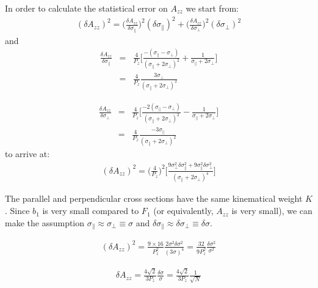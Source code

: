 In order to calculate the statistical error on $A_{zz}$ we start from:
\begin{eqnarray}
(\delta A_{zz})^2 = \Bigg( \frac{\delta A_{zz}}{\delta \sigma_{\parallel}} \Bigg)^2 (\delta \sigma_{\parallel})^2 + \Bigg( \frac{\delta A_{zz}}{\delta \sigma_{\perp}} \Bigg)^2 (\delta \sigma_{\perp})^2
\label{none} 
\end{eqnarray}
and
\begin{eqnarray*}
\frac{\delta A_{zz}}{\delta \sigma_{\parallel}} & = &\frac{4}{P_z} \Bigg[\frac{- (\sigma_{\parallel} - \sigma_{\perp})}{(\sigma_{\parallel} + 2 \sigma_{\perp})^2} + \frac{1}{\sigma_{\parallel} + 2 \sigma_{\perp}} \Bigg] \\
         & = & \frac{4}{P_z} \frac{3 \sigma_{\perp}}{(\sigma_{\parallel} + 2 \sigma_{\perp})^2}
\label{none} 
\end{eqnarray*}


\begin{eqnarray*}
\frac{\delta A_{zz}}{\delta \sigma_{\perp}} & = &\frac{4}{P_z} \Bigg[\frac{- 2 (\sigma_{\parallel} - \sigma_{\perp})}{(\sigma_{\parallel} + 2 \sigma_{\perp})^2} - \frac{1}{\sigma_{\parallel} + 2 \sigma_{\perp}} \Bigg] \\
         & = & \frac{4}{P_z} \frac{-3 \sigma_{\parallel}}{(\sigma_{\parallel} + 2 \sigma_{\perp})^2}
\label{none} 
\end{eqnarray*}
%
to arrive at:
\begin{eqnarray}
(\delta A_{zz})^2 = \Bigg(\frac{4}{P_z}\Bigg)^2 \Bigg[ \frac{9 \sigma_{\perp}^2 \delta \sigma_{\parallel}^2 + 9\sigma_{\parallel}^2 \delta \sigma_{\perp}^2 }{(\sigma_{\parallel} + 2 \sigma_{\perp})^4} \Bigg]
\label{none} 
\end{eqnarray}

The parallel and perpendicular cross sections have the same kinematical weight $K$. Since $b_1$ is very small compared to $F_1$ (or equivalently, $A_{zz}$ is very small), we can make the assumption $\sigma_{\parallel} \approx \sigma_{\perp} \equiv \sigma$ and  $\delta \sigma_{\parallel} \approx  \delta \sigma_{\perp} \equiv \delta \sigma$. 

\begin{eqnarray}
(\delta A_{zz})^2 = \frac{9 \times 16}{P_z^2} \frac{2 \sigma^2 \delta \sigma^2}{(3 \sigma)^4} = \frac{32}{9 P_z^2} \frac{\delta \sigma^2}{\sigma^2}
\label{none} 
\end{eqnarray}

\begin{eqnarray}
\delta A_{zz} = \frac{4 \sqrt{2}}{3 P_z} \frac{\delta \sigma}{\sigma} =  \frac{4 \sqrt{2}}{3 P_z} \frac{1}{\sqrt{N}}
\label{none} 
\end{eqnarray}

